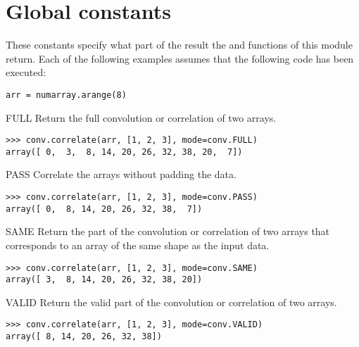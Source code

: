 


\section{Global constants}
\label{sec:CONV:global-constants}

These constants specify what part of the result the  and
 functions of this module return.  Each of the following
examples assumes that the following code has been executed:

\begin{verbatim}
arr = numarray.arange(8)
\end{verbatim}

\begin{datadesc}{FULL}
   Return the full convolution or correlation of two arrays.
\begin{verbatim}
>>> conv.correlate(arr, [1, 2, 3], mode=conv.FULL)
array([ 0,  3,  8, 14, 20, 26, 32, 38, 20,  7])
\end{verbatim}
\end{datadesc}

\begin{datadesc}{PASS}
   Correlate the arrays without padding the data.
\begin{verbatim}
>>> conv.correlate(arr, [1, 2, 3], mode=conv.PASS)
array([ 0,  8, 14, 20, 26, 32, 38,  7])
\end{verbatim}
\end{datadesc}

\begin{datadesc}{SAME}
   Return the part of the convolution or correlation of two arrays that
   corresponds to an array of the same shape as the input data.
\begin{verbatim}
>>> conv.correlate(arr, [1, 2, 3], mode=conv.SAME)
array([ 3,  8, 14, 20, 26, 32, 38, 20])
\end{verbatim}
\end{datadesc}

\begin{datadesc}{VALID}
   Return the valid part of the convolution or correlation of two arrays.
\begin{verbatim}
>>> conv.correlate(arr, [1, 2, 3], mode=conv.VALID)
array([ 8, 14, 20, 26, 32, 38])
\end{verbatim}
\end{datadesc}



